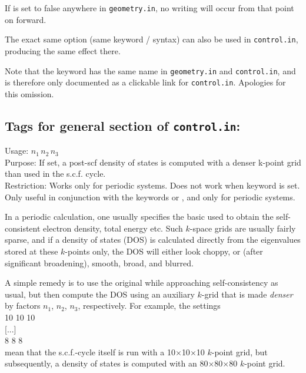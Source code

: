If  is set to false anywhere in
\texttt{geometry.in}, no writing will occur from that point on
forward.

The exact same option (same keyword / syntax) can also be used in
\texttt{control.in}, producing the same effect there.

Note that the keyword has the same name in \texttt{geometry.in} and
\texttt{control.in}, and is therefore only documented as a clickable
link for \texttt{control.in}. Apologies for this omission.

\subsection*{Tags for general section of \texttt{control.in}:}

{
  \noindent
  Usage:  $n_1 \, n_2 \, n_3$ \\[1.0ex]
  Purpose: If set, a post-scf density of states is computed with a
    denser k-point grid than used in the s.c.f. cycle. \\[1.0ex]
  Restriction: Works only for periodic systems. Does not work when keyword
     is set. \\
}
%
Only useful in conjunction with the keywords 
 or 
, and only for periodic systems.

In a periodic calculation, one usually specifies the basic
 used to obtain the self-consistent electron density,
total energy etc. Such $k$-space grids are usually fairly sparse, and
if a density of states (DOS) is calculated directly from the eigenvalues
stored at these $k$-points only, the DOS will either look choppy, or
(after significant broadening), smooth, broad, and blurred.

A simple remedy is to use the original  while
approaching self-consistency as usual, but then compute the DOS using
an auxiliary $k$-grid that is made \emph{denser} by factors $n_1$,
$n_2$, $n_3$, respectively. For example, the settings \\
   10 10 10 \\
    [...] \\
   8 8 8 \\
mean that the s.c.f.-cycle itself is run with a 10$\times$10$\times$10
$k$-point grid, but subsequently, a density of states is computed with
an 80$\times$80$\times$80 $k$-point grid.

